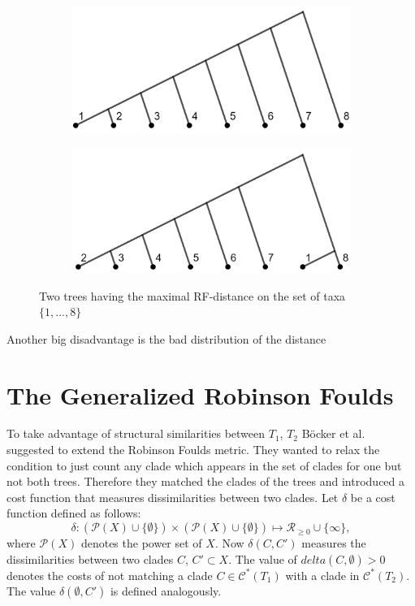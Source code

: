 \begin{figure}[ht!] \label{fig:maxRFdist}
    \begin{subfigure}[b]{0.45\textwidth}
        \includegraphics[width=\textwidth]{figures/RF_tree1.jpg}
    \end{subfigure}
    \quad
    \begin{subfigure}[b]{0.45\textwidth}
        \includegraphics[width=\textwidth]{figures/RF_tree2.jpg}
    \end{subfigure}
    \caption{Two trees having the maximal RF-distance on the set of taxa $\{1,...,8\}$}
\end{figure}
Another big disadvantage is the bad distribution of the distance 
 
\section{The Generalized Robinson Foulds}
To take advantage of structural similarities between $T_1$, $T_2$ Böcker et al.~\cite{Boe} suggested to extend the Robinson Foulds metric. They wanted to relax the condition to just count any clade which appears in the set of clades for one but not both trees. Therefore they matched the clades of the trees and introduced a cost function that measures dissimilarities between two clades. Let $\delta$ be a cost function defined as follows:
$$ \delta: (\mathcal{P}(X) \cup \{\emptyset\}) \times (\mathcal{P}(X) \cup \{\emptyset\}) \mapsto \mathcal{R}_{\geq 0} \cup \{\infty\},$$
where $\mathcal{P}(X)$ denotes the power set of $X$. Now $\delta(C,C')$ measures the dissimilarities between two clades $C$, $C' \subset X$. The value of $delta(C, \emptyset) > 0$ denotes the costs of not matching a clade $C \in \mathcal{C}^*(T_1)$ with a clade in $\mathcal{C}^*(T_2)$. The value $\delta(\emptyset, C')$ is defined analogously.

